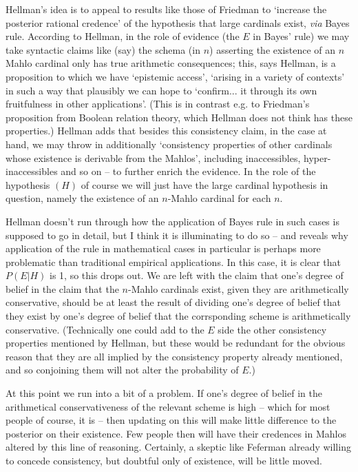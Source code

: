 \documentclass{amsart}
\theoremstyle{definition}
\begin{document}
Hellman's idea is to appeal to results like those of Friedman 
to `increase the posterior rational credence' of the hypothesis that large 
cardinals exist, \emph{via}  Bayes rule. According to Hellman, 
in the role of evidence (the $E$ in Bayes' rule) we may take syntactic 
claims like (say) the schema (in $n$) asserting the existence of an $n$ Mahlo cardinal
only has true arithmetic consequences; this, says Hellman, is a proposition to which 
we have `epistemic access', `arising in a variety of contexts' in such a way that
plausibly we can hope to `confirm... it through its own fruitfulness in other applications'.
(This is in contrast e.g. to Friedman's proposition from Boolean relation theory,
which Hellman does not think has these properties.) Hellman adds that besides this
consistency claim, in the case at hand, we may throw in additionally `consistency 
properties of other cardinals whose existence is derivable from the Mahlos', 
including inaccessibles, hyper-inaccessibles and so on -- 
to further enrich the evidence. In the role of the hypothesis $(H)$ of course
we will just have the large cardinal hypothesis in question, namely 
the existence of an $n$-Mahlo cardinal for each $n$. 

Hellman doesn't run through how the application of Bayes rule in 
such cases is supposed to go in detail, but I think it is illuminating to do so 
-- and reveals why application of the rule in mathematical cases in particular 
is perhaps more problematic than traditional empirical applications. 
In this case, it is clear that $P(E|H)$ is 1, so this drops out. 
We are left with the claim that one's degree of belief in the claim that 
the $n$-Mahlo cardinals exist, given they are arithmetically conservative, should be at least 
the result of dividing one's degree of belief that they exist by 
one's degree of belief that the corrsponding scheme is arithmetically conservative. (Technically
one could add to the $E$ side the other consistency properties mentioned by Hellman,
but these would be redundant for the obvious reason that they are all implied by 
the consistency property already mentioned, and so conjoining them
will not alter the probability of $E$.)

At this point we run into a bit of a problem. If one's degree of belief 
in the arithmetical conservativeness of the relevant scheme is high -- which for most people 
of course, it is -- then updating on this will make little difference to the 
posterior on their existence. Few people then will have their credences in 
Mahlos altered by this line of reasoning. Certainly, a skeptic like Feferman already
willing to concede consistency, but doubtful only of existence, will be little moved.
\end{document}
